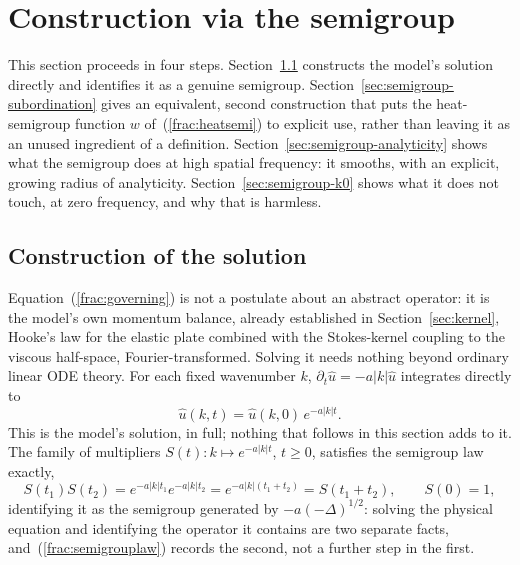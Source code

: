 \documentclass{article}
\begin{document}
\section{Construction via the semigroup}
\label{sec:semigroup}

This section proceeds in four steps. Section~\ref{sec:semigroup-construction}
constructs the model's solution directly and identifies it as a genuine
semigroup. Section~\ref{sec:semigroup-subordination} gives an equivalent,
second construction that puts the heat-semigroup function $w$
of~(\ref{frac:heatsemi}) to explicit use, rather than leaving it as an
unused ingredient of a definition. Section~\ref{sec:semigroup-analyticity}
shows what the semigroup does at high spatial frequency: it smooths, with
an explicit, growing radius of analyticity. Section~\ref{sec:semigroup-k0}
shows what it does not touch, at zero frequency, and why that is harmless.

\subsection{Construction of the solution}
\label{sec:semigroup-construction}

Equation~(\ref{frac:governing}) is not a postulate about an abstract
operator: it is the model's own momentum balance, already established in
Section~\ref{sec:kernel}, Hooke's law for the elastic plate combined with
the Stokes-kernel coupling to the viscous half-space, Fourier-transformed.
Solving it needs nothing beyond ordinary linear ODE theory. For each fixed
wavenumber $k$, $\partial_t\hat u = -a|k|\hat u$ integrates directly to
\begin{equation}
\hat u(k,t) = \hat u(k,0)\,e^{-a|k|t}.
\label{frac:semigroup}
\end{equation}
This is the model's solution, in full; nothing that follows in this
section adds to it. The family of multipliers $S(t):k\mapsto e^{-a|k|t}$,
$t\ge0$, satisfies the semigroup law exactly,
\begin{equation}
S(t_1)S(t_2) = e^{-a|k|t_1}e^{-a|k|t_2} = e^{-a|k|(t_1+t_2)} = S(t_1+t_2),
\qquad S(0)=1,
\label{frac:semigrouplaw}
\end{equation}
identifying it as the semigroup generated by $-a(-\Delta)^{1/2}$: solving
the physical equation and identifying the operator it contains are two
separate facts, and~(\ref{frac:semigrouplaw}) records the second, not a
further step in the first.
\end{document}
